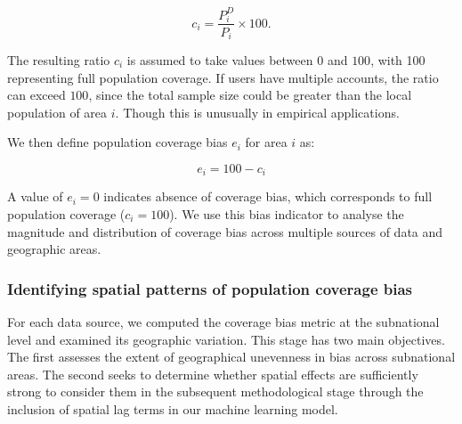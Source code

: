 \documentclass[]{rsos}%
\begin{document}
\begin{equation}
c_i = \dfrac{P_i^D}{P_i} \times 100.
\end{equation}

The resulting ratio \(c_i\) is assumed to take values
between \(0\) and \(100\), with 100 representing full population coverage.
If users have multiple accounts, the ratio can exceed \(100\), since the
total sample size could be greater than the local population of area
\(i\). Though this is unusually in empirical applications.

We then define population coverage bias \(e_i\) for area \(i\) as:

\begin{equation} \label{eq:size-bias}
e_i = 100 - c_i
\end{equation}

A value of \(e_i = 0\) indicates absence of coverage bias, which
corresponds to full population coverage (\(c_i = 100\)). We use this bias
indicator to analyse the magnitude and distribution of coverage bias
across multiple sources of data and geographic areas.

\subsubsection{Identifying spatial patterns of population coverage bias}\label{identifying-spatial-patterns-of-population-coverage-bias}

For each data source, we computed the coverage bias metric at the
subnational level and examined its geographic variation. This stage has
two main objectives. The first assesses the extent of geographical unevenness in bias
across subnational areas. The second seeks to determine whether spatial effects are
sufficiently strong to consider them in the subsequent methodological
stage through the inclusion of spatial lag terms in our
machine learning model.
\end{document}
